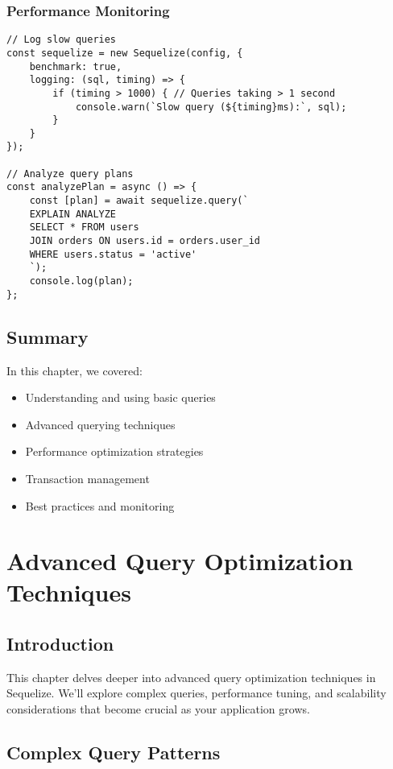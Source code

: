 \documentclass[12pt,a4paper]{book}
\begin{document}
	\subsection{Performance Monitoring}
	\begin{tcolorbox}[title=Monitoring Query Performance]
		\begin{verbatim}
// Log slow queries
const sequelize = new Sequelize(config, {
	benchmark: true,
	logging: (sql, timing) => {
		if (timing > 1000) { // Queries taking > 1 second
			console.warn(`Slow query (${timing}ms):`, sql);
		}
	}
});

// Analyze query plans
const analyzePlan = async () => {
	const [plan] = await sequelize.query(`
	EXPLAIN ANALYZE
	SELECT * FROM users
	JOIN orders ON users.id = orders.user_id
	WHERE users.status = 'active'
	`);
	console.log(plan);
};
		\end{verbatim}
	\end{tcolorbox}
	
	\section{Summary}
	In this chapter, we covered:
	\begin{itemize}
		\item Understanding and using basic queries
		\item Advanced querying techniques
		\item Performance optimization strategies
		\item Transaction management
		\item Best practices and monitoring
	\end{itemize}
	
	\chapter{Advanced Query Optimization Techniques}
	
	\section{Introduction}
	This chapter delves deeper into advanced query optimization techniques in Sequelize. We'll explore complex queries, performance tuning, and scalability considerations that become crucial as your application grows.
	
	\section{Complex Query Patterns}
	
\end{document}

